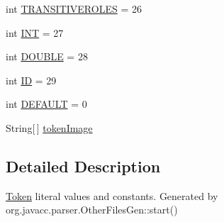 \begin{DoxyCompactItemize}
\item 
int \hyperlink{interfaceuk_1_1ac_1_1manchester_1_1cs_1_1owlapi_1_1dlsyntax_1_1parser_1_1_d_l_syntax_parser_constants_adec6ebde5b7a75c188a2e9814343a961}{T\-R\-A\-N\-S\-I\-T\-I\-V\-E\-R\-O\-L\-E\-S} = 26
\item 
int \hyperlink{interfaceuk_1_1ac_1_1manchester_1_1cs_1_1owlapi_1_1dlsyntax_1_1parser_1_1_d_l_syntax_parser_constants_ae8193217fa4bbbb26492cbd91761a6f4}{I\-N\-T} = 27
\item 
int \hyperlink{interfaceuk_1_1ac_1_1manchester_1_1cs_1_1owlapi_1_1dlsyntax_1_1parser_1_1_d_l_syntax_parser_constants_a2124bf2ea9dc0b442c47d03e4cc2d7b6}{D\-O\-U\-B\-L\-E} = 28
\item 
int \hyperlink{interfaceuk_1_1ac_1_1manchester_1_1cs_1_1owlapi_1_1dlsyntax_1_1parser_1_1_d_l_syntax_parser_constants_a28ff7a30525d001259b20a52268a2acd}{I\-D} = 29
\item 
int \hyperlink{interfaceuk_1_1ac_1_1manchester_1_1cs_1_1owlapi_1_1dlsyntax_1_1parser_1_1_d_l_syntax_parser_constants_a91368f17a6b2d20c3aad9f09d6519e0a}{D\-E\-F\-A\-U\-L\-T} = 0
\item 
String\mbox{[}$\,$\mbox{]} \hyperlink{interfaceuk_1_1ac_1_1manchester_1_1cs_1_1owlapi_1_1dlsyntax_1_1parser_1_1_d_l_syntax_parser_constants_af5529603d82f703b5480e5d85d0e7025}{token\-Image}
\end{DoxyCompactItemize}


\subsection{Detailed Description}
\hyperlink{classuk_1_1ac_1_1manchester_1_1cs_1_1owlapi_1_1dlsyntax_1_1parser_1_1_token}{Token} literal values and constants. Generated by org.\-javacc.\-parser.\-Other\-Files\-Gen\-::start() 

